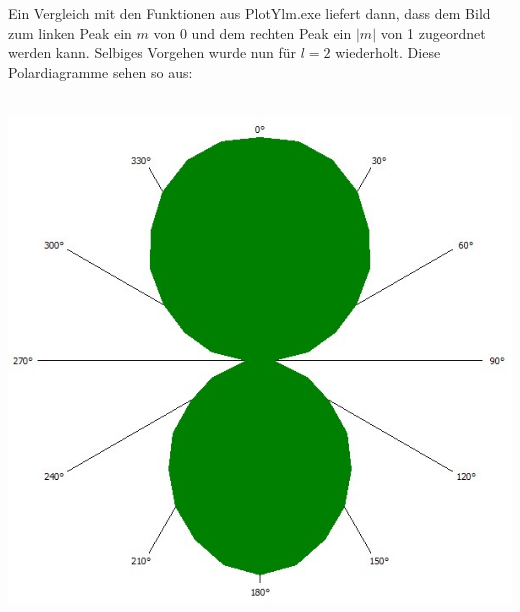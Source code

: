 \documentclass[german,  %
parskip=full,  %
]{scrartcl}
\begin{document}
\\\\
Ein Vergleich mit den Funktionen aus PlotYlm.exe liefert dann, dass dem Bild zum linken Peak ein $m$ von 0 und dem rechten Peak ein $|m|$ von 1 zugeordnet werden kann. 
\newline Selbiges Vorgehen wurde nun für $l=2$ wiederholt. Diese Polardiagramme sehen so aus:
\\\\
\begin{minipage}{0.4 \textwidth} \centering
\includegraphics[scale=0.3]{445_l2_linker_Peak.jpg}
\end{minipage}
\begin{minipage}{0.2\textwidth}\centering
\
\end{minipage}
\end{document}

